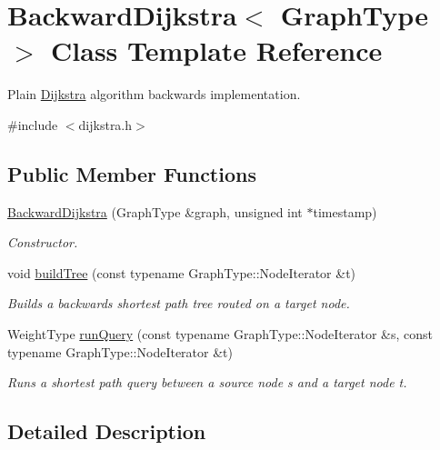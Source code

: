\hypertarget{class_backward_dijkstra}{
\section{BackwardDijkstra$<$ GraphType $>$ Class Template Reference}
\label{class_backward_dijkstra}
}


Plain \hyperlink{class_dijkstra}{Dijkstra} algorithm backwards implementation.  




{\ttfamily \#include $<$dijkstra.h$>$}

\subsection*{Public Member Functions}
\begin{DoxyCompactItemize}
\item 
\hyperlink{class_backward_dijkstra_a992f46940cf6d789152204e16032c149}{BackwardDijkstra} (GraphType \&graph, unsigned int $\ast$timestamp)
\begin{DoxyCompactList}\small\item\em Constructor. \item\end{DoxyCompactList}\item 
void \hyperlink{class_backward_dijkstra_a5f505399fd812f67b311e63f9f80654f}{buildTree} (const typename GraphType::NodeIterator \&t)
\begin{DoxyCompactList}\small\item\em Builds a backwards shortest path tree routed on a target node. \item\end{DoxyCompactList}\item 
WeightType \hyperlink{class_backward_dijkstra_a00388196b398e4d2180675bc758d6a58}{runQuery} (const typename GraphType::NodeIterator \&s, const typename GraphType::NodeIterator \&t)
\begin{DoxyCompactList}\small\item\em Runs a shortest path query between a source node s and a target node t. \item\end{DoxyCompactList}\end{DoxyCompactItemize}


\subsection{Detailed Description}
